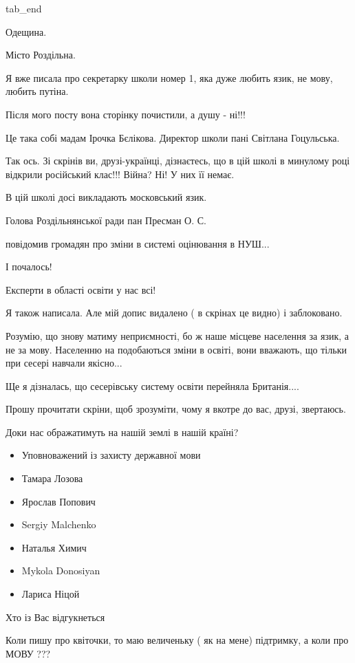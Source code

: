   tab_end
\fi

Одещина.

Місто Роздільна.

Я вже писала про секретарку школи номер 1, яка дуже любить язик, не мову, любить путіна.

Після мого посту вона сторінку почистили, а душу - ні!!!

Це така собі мадам Ірочка Бєлікова. Директор школи пані Світлана Гоцульська.

Так ось. Зі скрінів ви, друзі-українці, дізнаєтесь, що в цій школі в минулому
році відкрили російський клас!!! Війна? Ні! У них її немає.

В цій школі досі викладають московський язик.

Голова Роздільнянської ради пан Пресман О. С.

повідомив громадян про зміни в системі оцінювання в НУШ...

І почалось! 

Експерти в області освіти у нас всі! 

Я також написала. Але мій допис видалено ( в скрінах це видно) і заблоковано.

Розумію, що знову матиму неприємності, бо ж наше місцеве населення за язик, а
не за мову. Населенню на подобаються зміни в освіті, вони вважають, що тільки
при сесері навчали якісно...

Ще я дізналась, що сесерівську систему освіти перейняла Британія....

Прошу прочитати скріни, щоб зрозуміти, чому я вкотре до вас, друзі, звертаюсь.

Доки нас ображатимуть на нашій землі в нашій країні?

\begin{itemize}
  \item Уповноважений із захисту державної мови 
  \item Тамара Лозова 
  \item Ярослав Попович 
  \item Sergiy Malchenko 
  \item Наталья Химич 
  \item Mykola Donosiyan 
  \item Лариса Ніцой 
\end{itemize}

Хто із Вас відгукнеться

Коли пишу про квіточки, то маю величеньку ( як на мене) підтримку, а коли про МОВУ ???

